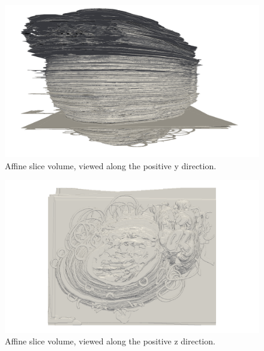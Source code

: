 	\begin{figure}
	  \centering
	  \includegraphics[width=0.9\textheight]{Ch6/Figs/Rat28/contours/whole_positive_y_affine}
	  \caption{Affine slice volume, viewed along the positive y direction.}
	  \label{fig:positive_y_affine_contour}
	\end{figure}

	\begin{figure}
	  \centering
	  \includegraphics[width=0.9\textheight]{Ch6/Figs/Rat28/contours/whole_positive_z_affine}
	  \caption{Affine slice volume, viewed along the positive z direction.}
	  \label{fig:positive_z_affine_contour}
	\end{figure}
	
